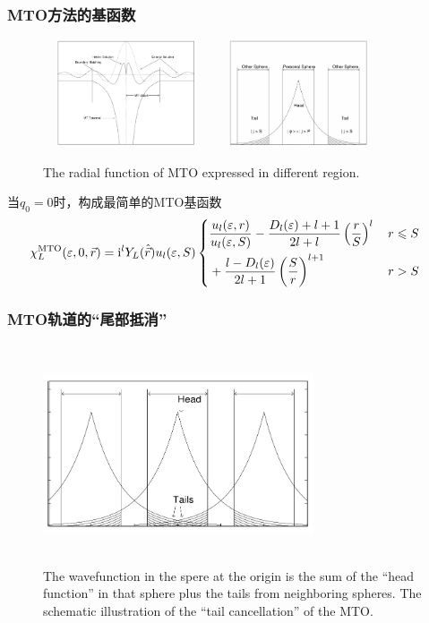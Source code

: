 \frame
{
	\frametitle{\textrm{MTO}方法的基函数}
\begin{figure}[h!]
	\vspace{-13pt}
\centering
\includegraphics[height=1.25in,width=1.95in,viewport=0 0 845 635,clip]{Figures/MTO-envelope-1.png}
\includegraphics[height=1.25in,width=1.95in,viewport=0 0 885 635,clip]{Figures/MTO-envelope-2.png}
\caption{\tiny \textrm{The radial function of MTO expressed in different region.}}%
\label{MTO-envelope}
\end{figure}
当$q_0=0$时，构成最简单的\textrm{MTO}基函数
		\begin{displaymath}
			\hspace*{-12pt}\chi_L^{\mathrm{MTO}}(\varepsilon,0,\vec r)=\mathrm{i}^lY_L(\hat{\vec r})u_l(\varepsilon,S)\left\{
			\begin{aligned}
				&\dfrac{u_l(\varepsilon,r)}{u_l(\varepsilon,S)}-\dfrac{D_l(\varepsilon)+l+1}{2l+l}\left(\dfrac rS\right)^l&\, r\leqslant S\\
				&+\dfrac{l-D_l(\varepsilon)}{2l+1}\left(\dfrac Sr\right)^{l+1}&\, r>S
			\end{aligned}\right.
		\end{displaymath}
}

\frame
{
	\frametitle{\textrm{MTO}轨道的“尾部抵消”}
\begin{figure}[h!]
	\vspace*{-0.7in}
\centering
\includegraphics[height=2.55in,width=3.15in,viewport=0 0 845 635,clip]{Figures/MTO-Tail_cancellation.png}
\caption{\tiny \textrm{The wavefunction in the spere at the origin is the sum of the ``head function'' in that sphere plus the tails from neighboring spheres. The schematic illustration of the ``tail cancellation'' of the MTO.}}%
\label{MTO-tail-candellation}
\end{figure}
}


